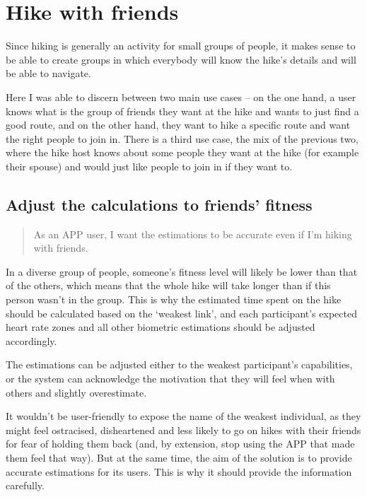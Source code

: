
\section{Hike with friends}\label{epic:friends}

Since hiking is generally an activity for small groups of people, it makes sense to be able to create groups in which everybody will know the hike's details and will be able to navigate.

Here I was able to discern between two main use cases -- on the one hand, a user knows what is the group of friends they want at the hike and wants to just find a good route,
and on the other hand, they want to hike a specific route and want the right people to join in.
There is a third use case, the mix of the previous two, where the hike host knows about some people they want at the hike (for example their spouse) and would just like people to join in if they want to.

\subsection{Adjust the calculations to friends' fitness}\label{US:friends-fitness}
\begin{quote}
As an APP user, I want the estimations to be accurate even if I'm hiking with friends.
\end{quote}

In a diverse group of people, someone's fitness level will likely be lower than that of the others, which means that the whole hike will take longer than if this person wasn't in the group.
This is why the estimated time spent on the hike should be calculated based on the `weakest link', and each participant's expected heart rate zones and all other biometric estimations should be adjusted accordingly.

The estimations can be adjusted either to the weakest participant's capabilities, or the system can acknowledge the motivation that they will feel when with others and slightly overestimate.

It wouldn't be user-friendly to expose the name of the weakest individual, as they might feel ostracised, disheartened and less likely to go on hikes with their friends for fear of holding them back
(and, by extension, stop using the APP that made them feel that way).
But at the same time, the aim of the solution is to provide accurate estimations for its users.
This is why it should provide the information carefully.

